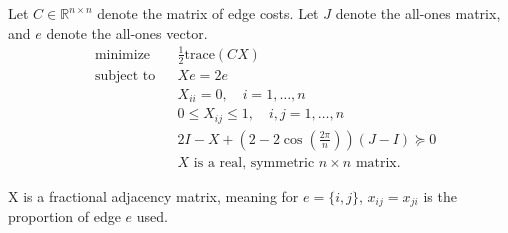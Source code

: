 \documentclass{article}
\begin{document}



Let $C \in \mathbb{R}^{n \times n}$ denote the matrix of edge costs. Let $J$ denote the all-ones matrix, and $e$ denote the all-ones vector.
\begin{equation*}
\begin{aligned}
& {\text{minimize}}
& & \frac{1}{2}\text{trace}(CX) \\
& \text{subject to}
& & Xe = 2e \\
&&& X_{ii} = 0, \quad i = 1,\ldots,n\\
&&& 0 \leq X_{ij} \leq 1, \quad i,j = 1,\ldots,n \\
&&& 2I - X + (2-2\cos\left(\frac{2\pi}{n}\right))(J-I) \succeq 0 \\
&&& X \text{ is a real, symmetric } n \times n \text{ matrix}.
\end{aligned}
\end{equation*}

\noindent X is a fractional adjacency matrix, meaning for $e = \{i, j\}$, $x_{ij} = x_{ji}$ is the proportion of edge $e$ used.
\end{document}
